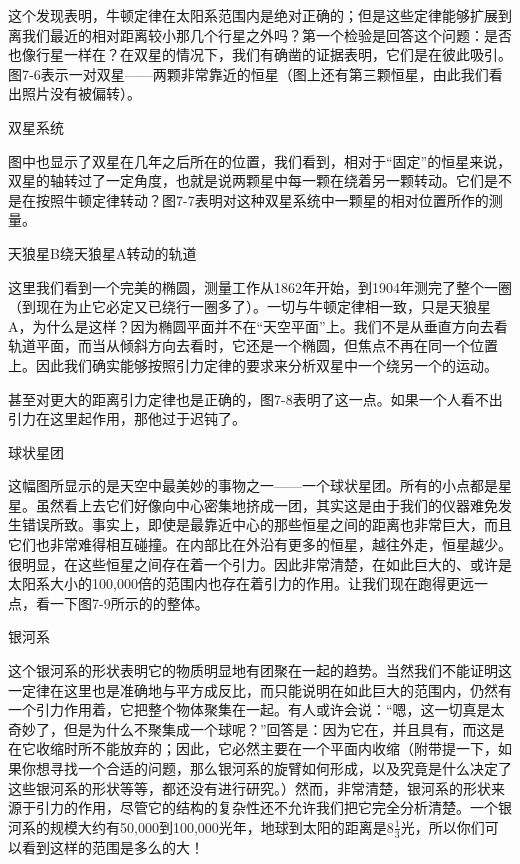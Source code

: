 \documentclass[12pt,oneside]{book}
\begin{document}
\begin{common-format}
这个发现表明，牛顿定律在太阳系范围内是绝对正确的；但是这些定律能够扩展到离我们最近的相对距离较小那几个行星之外吗？第一个检验是回答这个问题：是否也像行星一样在？在双星的情况下，我们有确凿的证据表明，它们是在彼此吸引。图7-6表示一对双星——两颗非常靠近的恒星（图上还有第三颗恒星，由此我们看出照片没有被偏转）。
\begin{linefig}{双星系统}
\caption{双星系统}
\label{fig:双星系统}
\end{linefig}
图中也显示了双星在几年之后所在的位置，我们看到，相对于“固定”的恒星来说，双星的轴转过了一定角度，也就是说两颗星中每一颗在绕着另一颗转动。它们是不是在按照牛顿定律转动？图7-7表明对这种双星系统中一颗星的相对位置所作的测量。
\begin{fig}{天狼星B绕天狼星A转动的轨道}
\caption{天狼星B绕天狼星A转动的轨道}
\label{fig:天狼星B绕天狼星A转动的轨道}
\end{fig}
这里我们看到一个完美的椭圆，测量工作从1862年开始，到1904年测完了整个一圈（到现在为止它必定又已绕行一圈多了）。一切与牛顿定律相一致，只是天狼星A，为什么是这样？因为椭圆平面并不在“天空平面”上。我们不是从垂直方向去看轨道平面，而当从倾斜方向去看时，它还是一个椭圆，但焦点不再在同一个位置上。因此我们确实能够按照引力定律的要求来分析双星中一个绕另一个的运动。

甚至对更大的距离引力定律也是正确的，图7-8表明了这一点。如果一个人看不出引力在这里起作用，那他过于迟钝了。
\begin{linefig}{球状星团}
\caption{球状星团}
\label{fig:球状星团}
\end{linefig}
这幅图所显示的是天空中最美妙的事物之一——一个球状星团。所有的小点都是星星。虽然看上去它们好像向中心密集地挤成一团，其实这是由于我们的仪器难免发生错误所致。事实上，即使是最靠近中心的那些恒星之间的距离也非常巨大，而且它们也非常难得相互碰撞。在内部比在外沿有更多的恒星，越往外走，恒星越少。很明显，在这些恒星之间存在着一个引力。因此非常清楚，在如此巨大的、或许是太阳系大小的100,000倍的范围内也存在着引力的作用。让我们现在跑得更远一点，看一下图7-9所示的的整体。
\begin{linefig}{银河系}
\caption{银河系}
\label{fig:银河系}
\end{linefig}
这个银河系的形状表明它的物质明显地有团聚在一起的趋势。当然我们不能证明这一定律在这里也是准确地与平方成反比，而只能说明在如此巨大的范围内，仍然有一个引力作用着，它把整个物体聚集在一起。有人或许会说：“嗯，这一切真是太奇妙了，但是为什么不聚集成一个球呢？”回答是：因为它在，并且具有，而这是在它收缩时所不能放弃的；因此，它必然主要在一个平面内收缩（附带提一下，如果你想寻找一个合适的问题，那么银河系的旋臂如何形成，以及究竟是什么决定了这些银河系的形状等等，都还没有进行研究。）然而，非常清楚，银河系的形状来源于引力的作用，尽管它的结构的复杂性还不允许我们把它完全分析清楚。一个银河系的规模大约有50,000到100,000光年，地球到太阳的距离是$8\frac{1}{3}$光，所以你们可以看到这样的范围是多么的大！


\end{common-format}
\end{document}
